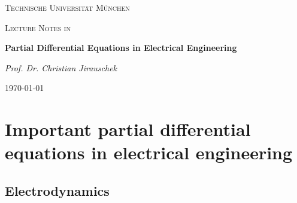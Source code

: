 \documentclass[10pt,a4paper]{report}
\begin{document}
\begin{titlepage}
	\centering
	{\scshape\LARGE Technische Universit\"at M\"unchen\par}
	\vspace{1cm}
	{\scshape\Large Lecture Notes in\par}
	\vspace{1.5cm}
	{\huge\bfseries Partial Differential Equations in Electrical Engineering \par}
	\vspace{2cm}
	{\Large\itshape Prof. Dr. Christian Jirauschek \par}
	\vfill
	{\large \today\par}
\end{titlepage}
\tableofcontents{}

\chapter{Important partial differential equations in electrical engineering} 
\section{Electrodynamics}
\end{document}
